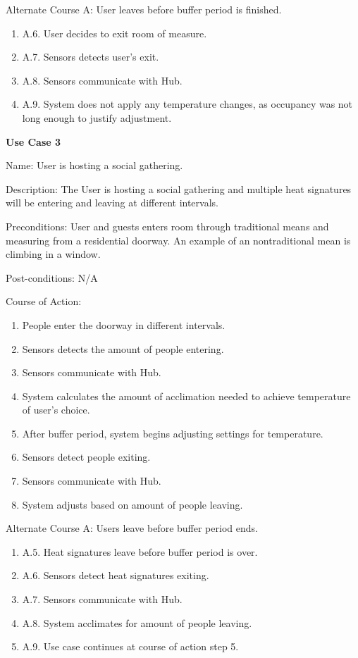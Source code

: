 \documentclass{article}
\begin{document}
\begin{flushleft}
    Alternate Course A: User leaves before buffer period is finished.
\end{flushleft}
\begin{enumerate}
    \item A.6. User decides to exit room of measure.
    \item A.7. Sensors detects user's exit.
    \item A.8. Sensors communicate with Hub.
    \item A.9. System does not apply any temperature changes, as occupancy was not long enough to justify adjustment.
\end{enumerate}

\begin{flushleft}
\textbf{Use Case 3}

Name: User is hosting a social gathering.

Description: The User is hosting a social gathering and multiple heat signatures will be entering and leaving at different intervals.

Preconditions:
User and guests enters room through traditional means and measuring from a residential doorway. An example of an nontraditional mean is climbing in a window.

Post-conditions: N/A

Course of Action:
\end{flushleft}
\begin{enumerate}
    \item People enter the doorway in different intervals.
    \item Sensors detects the amount of people entering.
    \item Sensors communicate with Hub.
    \item System calculates the amount of acclimation needed to achieve temperature of user's choice.
    \item After buffer period, system begins adjusting settings for temperature.
    \item Sensors detect people exiting.
    \item Sensors communicate with Hub.
    \item System adjusts based on amount of people leaving.
\end{enumerate}

\begin{flushleft}
Alternate Course A: Users leave before buffer period ends.
\end{flushleft}
\begin{enumerate}
    \item A.5. Heat signatures leave before buffer period is over.
    \item A.6. Sensors detect heat signatures exiting.
    \item A.7. Sensors communicate with Hub.
    \item A.8. System acclimates for amount of people leaving.
    \item A.9. Use case continues at course of action step 5.
\end{enumerate}
\end{document}
